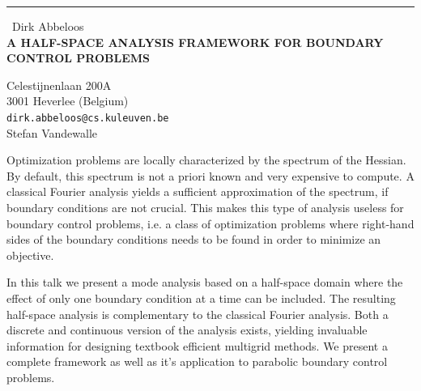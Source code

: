 \documentclass{report}
\begin{document}
\begin{center}
\rule{6in}{1pt} \
{\large Dirk Abbeloos \\
{\bf A HALF-SPACE ANALYSIS FRAMEWORK FOR BOUNDARY CONTROL PROBLEMS }}

Celestijnenlaan 200A \\ 3001 Heverlee (Belgium)
\\
{\tt dirk.abbeloos@cs.kuleuven.be}\\
Stefan Vandewalle\end{center}

Optimization problems are locally characterized by the spectrum of the
Hessian. By default, this spectrum is not a priori known and very
expensive to compute. A classical Fourier analysis yields a sufficient
approximation of the spectrum, if boundary conditions are not crucial.
This makes this type of analysis useless for boundary control problems,
i.e. a class of optimization problems where right-hand sides of the
boundary conditions needs to be found in order to minimize an objective.

In this talk we present a mode analysis based on a half-space domain
where the effect of only one boundary condition at a time can be
included. The resulting half-space analysis is complementary to the
classical Fourier analysis. Both a discrete and continuous version of the
analysis exists, yielding invaluable information for designing textbook
efficient multigrid methods. We present a complete framework as well as
it's application to parabolic boundary control problems.
\end{document}
